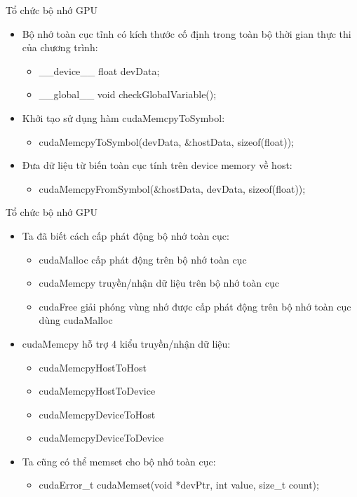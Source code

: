 \documentclass[10pt]{beamer}
\theoremstyle{remark}
\numberwithin{algocf}{section}
\numberwithin{equation}{section}
\numberwithin{dl}{section}
\numberwithin{figure}{section}
\begin{document}
\begin{frame}{Tổ chức bộ nhớ GPU}
    \begin{itemize}
        \item Bộ nhớ toàn cục tĩnh có kích thước cố định trong toàn bộ thời gian thực thi của chương trình:
        \begin{itemize}
            \item \_\_device\_\_ float devData;
            \item \_\_global\_\_ void checkGlobalVariable();
        \end{itemize}
        \item Khởi tạo sử dụng hàm cudaMemcpyToSymbol:
        \begin{itemize}
            \item cudaMemcpyToSymbol(devData, \&hostData, sizeof(float));
        \end{itemize}
        \item Đưa dữ liệu từ biến toàn cục tính trên device memory về host:
        \begin{itemize}
            \item cudaMemcpyFromSymbol(\&hostData, devData, sizeof(float));
        \end{itemize}
    \end{itemize}
\end{frame}

\begin{frame}[shrink]{Tổ chức bộ nhớ GPU}
    \begin{itemize}
        \item Ta đã biết cách cấp phát động bộ nhớ toàn cục:
        \begin{itemize}
            \item cudaMalloc cấp phát động trên bộ nhớ toàn cục
            \item cudaMemcpy truyền/nhận dữ liệu trên bộ nhớ toàn cục 
            \item cudaFree giải phóng vùng nhớ được cấp phát động trên bộ nhớ toàn cục dùng cudaMalloc
        \end{itemize}
        \item cudaMemcpy hỗ trợ 4 kiểu truyền/nhận dữ liệu:
        \begin{itemize}
            \item cudaMemcpyHostToHost
            \item cudaMemcpyHostToDevice
            \item cudaMemcpyDeviceToHost
            \item cudaMemcpyDeviceToDevice
        \end{itemize}
        \item Ta cũng có thể memset cho bộ nhớ toàn cục:
        \begin{itemize}
            \item cudaError\_t cudaMemset(void *devPtr, int value, size\_t count);
            
        \end{itemize}
    \end{itemize}
\end{frame}
\end{document}
